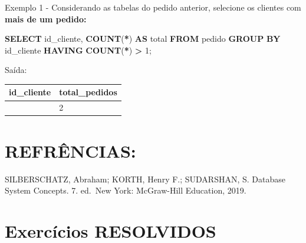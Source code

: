 \documentclass[
]{book}
\newenvironment{Shaded}{\begin{snugshade}}{\end{snugshade}}
\newcommand{\DecValTok}[1]{\textcolor[rgb]{0.00,0.00,0.81}{#1}}
\newcommand{\FunctionTok}[1]{\textcolor[rgb]{0.13,0.29,0.53}{\textbf{#1}}}
\newcommand{\KeywordTok}[1]{\textcolor[rgb]{0.13,0.29,0.53}{\textbf{#1}}}
\newcommand{\NormalTok}[1]{#1}
\newcommand{\OperatorTok}[1]{\textcolor[rgb]{0.81,0.36,0.00}{\textbf{#1}}}
\begin{document}
Exemplo 1 - Considerando as tabelas do pedido anterior, selecione os clientes com \textbf{mais de um pedido:}

\begin{Shaded}
\begin{Highlighting}[]
\KeywordTok{SELECT}\NormalTok{ id\_cliente, }\FunctionTok{COUNT}\NormalTok{(}\OperatorTok{*}\NormalTok{) }\KeywordTok{AS}\NormalTok{ total}
\KeywordTok{FROM}\NormalTok{ pedido}
\KeywordTok{GROUP} \KeywordTok{BY}\NormalTok{ id\_cliente}
\KeywordTok{HAVING} \FunctionTok{COUNT}\NormalTok{(}\OperatorTok{*}\NormalTok{) }\OperatorTok{\textgreater{}} \DecValTok{1}\NormalTok{;}
\end{Highlighting}
\end{Shaded}

Saída:

\begin{longtable}[]{@{}ll@{}}
\toprule\noalign{}
id\_cliente & total\_pedidos \\
\midrule\noalign{}
\endhead
\bottomrule\noalign{}
\endlastfoot
1 & 2 \\
\end{longtable}

\section{REFRÊNCIAS:}\label{refruxeancias}

SILBERSCHATZ, Abraham; KORTH, Henry F.; SUDARSHAN, S. Database System Concepts. 7. ed.~New York: McGraw-Hill Education, 2019.

\section{Exercícios RESOLVIDOS}\label{exercuxedcios-resolvidos-1}
\end{document}
